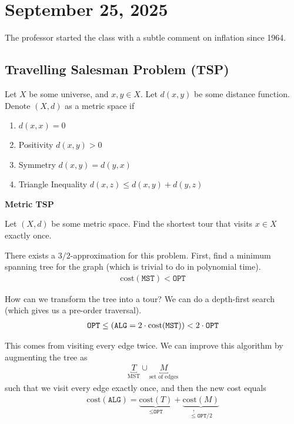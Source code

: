 \section{September 25, 2025}

The professor started the class with a subtle comment on inflation since 1964.

\subsection{Travelling Salesman Problem (TSP)}

\begin{definition}
    Let $X$ be some universe, and $x, y \in X$. Let $d(x, y)$ be some distance function. Denote $(X, d)$ as a metric space if
    \begin{enumerate}
        \item $d(x, x) = 0$
        \item Positivity $d(x, y) > 0$
        \item Symmetry $d(x, y) = d(y, x)$
        \item Triangle Inequality $d(x, z) \le d(x, y) + d(y, z)$
    \end{enumerate}
\end{definition}

\begin{definition}
    \textbf{Metric TSP}

    Let $(X, d)$ be some metric space. Find the shortest tour that visits $x \in X$ exactly once.
\end{definition}

There exists a $3/2$-approximation for this problem. First, find a minimum spanning tree for the graph (which is trivial to do in polynomial time).
\begin{align}
    \text{cost}(\texttt{MST}) < \texttt{OPT}
\end{align}

How can we transform the tree into a tour? We can do a depth-first search (which gives us a pre-order traversal).
\begin{align}
    \texttt{OPT} \le \qty (
        \texttt{ALG} = 2 \cdot \text{cost}(\texttt{MST})
    ) < 2 \cdot \texttt{OPT}
\end{align}

This comes from visiting every edge twice. We can improve this algorithm by augmenting the tree as
\begin{align}
    \underbracket{T}_\text{MST} \cup \underbracket{M}_\text{set of edges}
\end{align}
such that we visit every edge exactly once, and then the new cost equals
\begin{align}
    \text{cost}(\texttt{ALG}) = \underbrace{\text{cost}(T)}_{\le \texttt{OPT}} + \underbrace{\text{cost}(M)}_{\stackrel{?}{\le} \texttt{OPT}/2}
\end{align}


